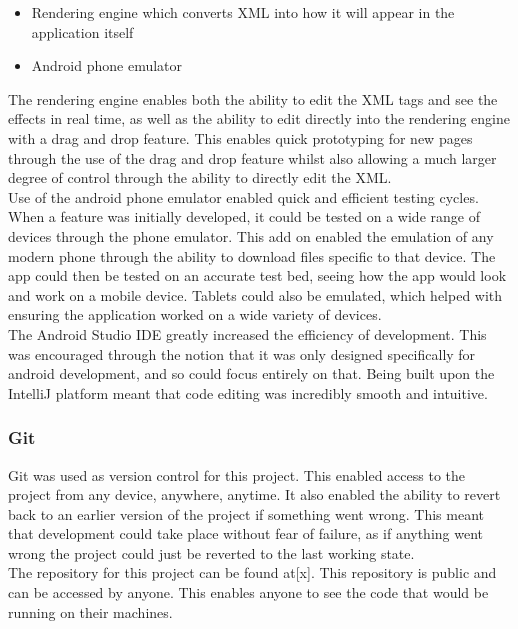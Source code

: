 \documentclass{article}
\begin{document}
\begin{itemize}
	\item Rendering engine which converts XML into how it will appear in the application itself
	\item Android phone emulator
\end{itemize}

The rendering engine enables both the ability to edit the XML tags and see the effects in real time, as well as the ability to edit directly into the rendering engine with a drag and drop feature. This enables quick prototyping for new pages through the use of the drag and drop feature whilst also allowing a much larger degree of control through the ability to directly edit the XML.\\

Use of the android phone emulator enabled quick and efficient testing cycles. When a feature was initially developed, it could be tested on a wide range of devices through the phone emulator. This add on enabled the emulation of any modern phone through the ability to download files specific to that device. The app could then be tested on an accurate test bed, seeing how the app would look and work on a mobile device. Tablets could also be emulated, which helped with ensuring the application worked on a wide variety of devices.\\

The Android Studio IDE greatly increased the efficiency of development. This was encouraged through the notion that it was only designed specifically for android development, and so could focus entirely on that. Being built upon the IntelliJ platform meant that code editing was incredibly smooth and intuitive. \\

\subsubsection{Git}

Git was used as version control for this project. This enabled access to the project from any device, anywhere, anytime. It also enabled the ability to revert back to an earlier version of the project if something went wrong. This meant that development could take place without fear of failure, as if anything went wrong the project could just be reverted to the last working state.\\

The repository for this project can be found at[x]. This repository is public and can be accessed by anyone. This enables anyone to see the code that would be running on their machines.\\
\end{document}

